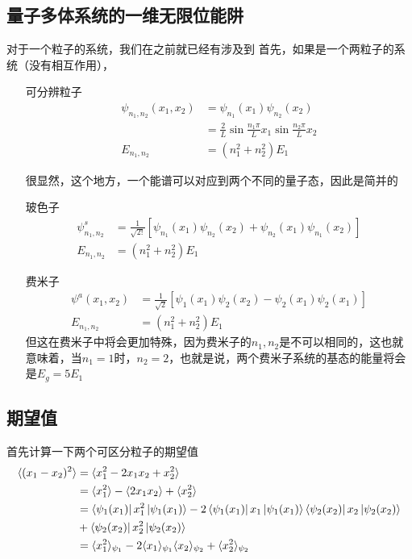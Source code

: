 \documentclass{article}
\newcommand{\expectation}[1]{\langle #1 \rangle}
\begin{document}
\subsection{量子多体系统的一维无限位能阱}
对于一个粒子的系统，我们在之前就已经有涉及到
首先，如果是一个两粒子的系统（没有相互作用），
\begin{enumerate}
    \item[可分辨粒子] 
    \begin{align*}
        \psi_{n_1,n_2}(x_1,x_2)&=\psi_{n_1}(x_1)\psi_{n_2}(x_2)\\
        &=\frac{2}{L}\sin{\frac{n_1\pi}{L}x_1}\sin{\frac{n_2\pi}{L}x_2}\\
        E_{n_1,n_2}&=(n_1^2+n_2^2)E_1
    \end{align*}

    很显然，这个地方，一个能谱可以对应到两个不同的量子态，因此是简并的
    \item[玻色子]
    \begin{align*}
        \psi_{n_1,n_2}^s&=\frac{1}{\sqrt{2!}}\left[\psi_{n_1}(x_1)\psi_{n_2}(x_2)+\psi_{n_2}(x_1)\psi_{n_1}(x_2)\right]\\
        E_{n_1,n_2}&=(n_1^2+n_2^2)E_1
    \end{align*}
    \item[费米子] 
    \begin{align*}
        \psi^a(x_1,x_2)&=\frac{1}{\sqrt{2}}\left[\psi_1(x_1)\psi_2(x_2)-\psi_2(x_1)\psi_2(x_1)\right]\\
        E_{n_1,n_2}&=(n_1^2+n_2^2)E_1
    \end{align*}
    但这在费米子中将会更加特殊，因为费米子的$n_1,n_2$是不可以相同的，这也就意味着，当$n_1=1$时，$n_2=2$，也就是说，两个费米子系统的基态的能量将会是$E_g=5E_1$
\end{enumerate}

\subsection{期望值}
首先计算一下两个可区分粒子的期望值
\begin{align*}
    \expectation{(x_1-x_2)^2}&=\expectation{x_1^2-2x_1x_2+x_2^2}\\
    &=\expectation{x_1^2}-\expectation{2x_1x_2}+\expectation{x_2^2}\\
    &=\bra{\psi_1(x_1)}x_1^2\ket{\psi_1(x_1)}-2\bra{\psi_1(x_1)}x_1\ket{\psi_1(x_1)}\bra{\psi_2(x_2)}x_2\ket{\psi_2(x_2)}\\
    &+\bra{\psi_2(x_2)}x_2^2\ket{\psi_2(x_2)}\\
    &=\expectation{x_1^2}_{\psi_1}-2\expectation{x_1}_{\psi_1}\expectation{x_2}_{\psi_2}+\expectation{x_2^2}_{\psi_2}
\end{align*}
\end{document}
